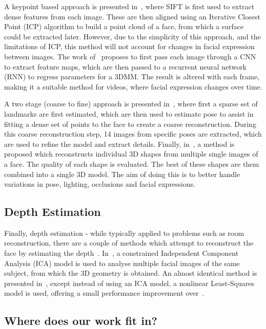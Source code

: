 A keypoint based approach is presented in~\cite{mayo20093d}, where
SIFT is first used to extract dense features from each image. These
are then aligned using an Iterative Closest Point (ICP) algorithm to
build a point cloud of a face, from which a surface could be extracted
later. However, due to the simplicity of this approach, and the
limitations of ICP, this method will not account for changes in facial
expression between images. The work of~\cite{dou2018multi} proposes to
first pass each image through a CNN to extract feature maps, which are
then passed to a recurrent neural network (RNN) to regress parameters
for a 3DMM. The result is altered with each frame, making it a
suitable method for videos, where facial expression changes over time.

A two stage (coarse to fine) approach is presented
in~\cite{dai2018coarse}, where first a sparse set of landmarks are
first estimated, which are then used to estimate pose to assist in
fitting a dense set of points to the face to create a coarse
reconstruction. During this coarse reconstruction step, 14 images from
specific poses are extracted, which are used to refine the model and
extract details. Finally, in~\cite{Piotraschke_2016_CVPR}, a method is
proposed which reconstructs individual 3D shapes from multiple single
images of a face. The quality of each shape is evaluated. The best of
these shapes are them combined into a single 3D model. The aim of
doing this is to better handle variations in pose, lighting,
occlusions and facial expressions.

\subsection{Depth Estimation}

Finally, depth estimation - while typically applied to problems such
as room reconstruction, there are a couple of methods which attempt to
reconstruct the face by estimating the
depth~\cite{sun2011depth,sun2013depth}. In~\cite{sun2011depth}, a
constrained Independent Component Analysis (ICA) model is used to
analyse multiple facial images of the same subject, from which the 3D
geometry is obtained. An almost identical method is presented
in~\cite{sun2013depth}, except instead of using an ICA model, a
nonlinear Least-Squares model is used, offering a small performance
improvement over~\cite{sun2011depth}.

\subsection{Where does our work fit in?}


